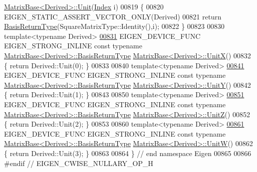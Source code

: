 \begin{DoxyCode}
      \hyperlink{group___core___module_a1f39dde25807c1f008aa874e690b3fed}{MatrixBase<Derived>::Unit}(\hyperlink{namespace_eigen_a62e77e0933482dafde8fe197d9a2cfde}{Index} i)
00819 \{
00820   EIGEN\_STATIC\_ASSERT\_VECTOR\_ONLY(Derived)
00821   \textcolor{keywordflow}{return} \hyperlink{group___core___module_class_eigen_1_1_block}{BasisReturnType}(SquareMatrixType::Identity(),i);
00822 \}
00823 
00830 \textcolor{keyword}{template}<\textcolor{keyword}{typename} Derived>
\hyperlink{group___core___module_ac12aa899494685551e11f238836ee600}{00831} EIGEN\_DEVICE\_FUNC EIGEN\_STRONG\_INLINE \textcolor{keyword}{const} \textcolor{keyword}{typename} 
      \hyperlink{group___core___module_class_eigen_1_1_block}{MatrixBase<Derived>::BasisReturnType} 
      \hyperlink{group___core___module_ac12aa899494685551e11f238836ee600}{MatrixBase<Derived>::UnitX}()
00832 \{ \textcolor{keywordflow}{return} Derived::Unit(0); \}
00833 
00840 \textcolor{keyword}{template}<\textcolor{keyword}{typename} Derived>
\hyperlink{group___core___module_ab8e21066a2e5cf5ca8bb0383e44a6efa}{00841} EIGEN\_DEVICE\_FUNC EIGEN\_STRONG\_INLINE \textcolor{keyword}{const} \textcolor{keyword}{typename} 
      \hyperlink{group___core___module_class_eigen_1_1_block}{MatrixBase<Derived>::BasisReturnType} 
      \hyperlink{group___core___module_ab8e21066a2e5cf5ca8bb0383e44a6efa}{MatrixBase<Derived>::UnitY}()
00842 \{ \textcolor{keywordflow}{return} Derived::Unit(1); \}
00843 
00850 \textcolor{keyword}{template}<\textcolor{keyword}{typename} Derived>
\hyperlink{group___core___module_a122e525a8f5ef3e4d459055615f662de}{00851} EIGEN\_DEVICE\_FUNC EIGEN\_STRONG\_INLINE \textcolor{keyword}{const} \textcolor{keyword}{typename} 
      \hyperlink{group___core___module_class_eigen_1_1_block}{MatrixBase<Derived>::BasisReturnType} 
      \hyperlink{group___core___module_a122e525a8f5ef3e4d459055615f662de}{MatrixBase<Derived>::UnitZ}()
00852 \{ \textcolor{keywordflow}{return} Derived::Unit(2); \}
00853 
00860 \textcolor{keyword}{template}<\textcolor{keyword}{typename} Derived>
\hyperlink{group___core___module_ac28c3d440440464b1fc8d9f2a6d5624a}{00861} EIGEN\_DEVICE\_FUNC EIGEN\_STRONG\_INLINE \textcolor{keyword}{const} \textcolor{keyword}{typename} 
      \hyperlink{group___core___module_class_eigen_1_1_block}{MatrixBase<Derived>::BasisReturnType} 
      \hyperlink{group___core___module_ac28c3d440440464b1fc8d9f2a6d5624a}{MatrixBase<Derived>::UnitW}()
00862 \{ \textcolor{keywordflow}{return} Derived::Unit(3); \}
00863 
00864 \} \textcolor{comment}{// end namespace Eigen}
00865 
00866 \textcolor{preprocessor}{#endif // EIGEN\_CWISE\_NULLARY\_OP\_H}
\end{DoxyCode}
